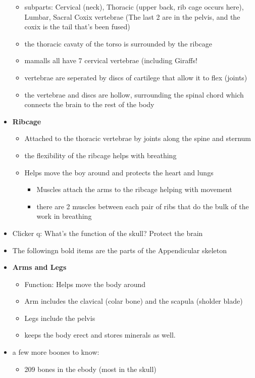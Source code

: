 \documentclass{article}
\theoremstyle{definition}
\begin{document}
\begin{itemize}
\begin{itemize}
			\item subparts: Cervical (neck), Thoracic (upper back, rib cage occurs here), Lumbar, Sacral Coxix vertebrae (The last 2 are in the pelvis, and the coxix is the tail that's been fused)
			\item the thoracic cavaty of the torso is surrounded by the ribcage
			\item mamalls all have 7 cervical vertebrae (including Giraffs!
			\item vertebrae are seperated by discs of cartilege that  allow it to flex (joints)
			\item the vertebrae and discs are hollow, surrounding the spinal chord  which connects the brain to the rest of the body
		\end{itemize}
	\item \textbf{Ribcage}
		\begin{itemize}
			\item Attached to the thoracic vertebrae by joints along the spine and sternum
			\item the flexibility of the ribcage helps with breathing
			\item Helps move the boy around and protects the heart and lungs
				\begin{itemize}
					\item Muscles attach the arms to the ribcage helping with movement
					\item there are 2 muscles between each pair of ribs that do the bulk of the work in breathing
				\end{itemize}
		\end{itemize}
	\item Clicker q: What's the function of the skull? Protect the brain
	\item The followingn bold items are the parts of the Appendicular skeleton
	\item \textbf{Arms and Legs} 
		\begin{itemize}
			\item Function: Helps move the body around
			\item Arm includes the clavical (colar bone) and the scapula (sholder blade)
			\item Legs include the pelvis
			\item keeps the body erect and stores minerals as well.
		\end{itemize}
	\item a few more boones to know:
		\begin{itemize}
			\item 209 bones in the ebody (most in the skull)

\end{itemize}
\end{itemize}
\end{document}

